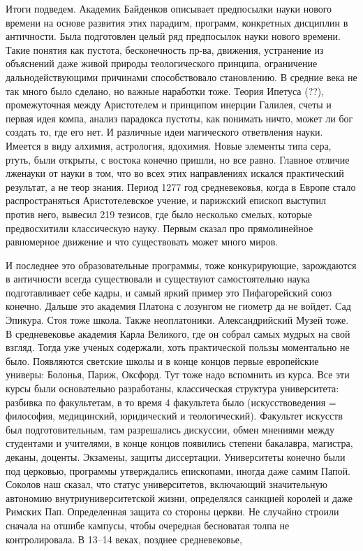 \documentclass[a4paper, 12pt]{article}
\begin{document}
Итоги подведем. Академик Байденков описывает предпосылки науки нового 
времени на основе развития этих парадигм, программ, конкретных дисциплин 
в античности. Была подготовлен целый ряд предпосылок науки нового 
времени. Такие понятия как пустота, бесконечность пр-ва, движения, 
устранение из объяснений даже живой природы теологического принципа, 
ограничение дальнодействующими причинами способствовало становлению. 
В средние века не так много было сделано, но важные наработки тоже. 
Теория Ипетуса (??), промежуточная между Аристотелем и принципом инерции 
Галилея, счеты и первая идея компа, анализ парадокса пустоты, как 
понимать ничто, может ли бог создать то, где его нет. И различные идеи 
магического ответвления науки. Имеется в виду алхимия, астрология, 
ядохимия. Новые элементы типа сера, ртуть, были открыты, с востока 
конечно пришли, но все равно. Главное отличие лженауки от науки в том, 
что во всех этих направлениях искался практический результат, а не теор 
знания. Период 1277 год средневековья, когда в Европе стало 
распространяться Аристотелевское учение, и парижский епископ выступил 
против него, вывесил 219 тезисов, где было несколько смелых, которые 
предвосхитили классическую науку. Первым сказал про прямолинейное 
равномерное движение и что существовать может много миров.

И последнее это образовательные программы, тоже конкурирующие, 
зарождаются в античности всегда существовали и существуют самостоятельно 
наука подготавливает себе кадры, и самый яркий пример это Пифагорейский 
союз конечно. Дальше это академия Платона с лозунгом не гиометр да не 
войдет. Сад Эпикура. Стоя тоже школа. Также неоплатоники. 
Александрийский Музей тоже. В средневековье академия Карла Великого, где 
он собрал самых мудрых на свой взгляд. Тогда уже ученых содержали, хоть 
практической пользы моментально не было. Появляются светские школы 
и в конце концов первые европейские универы: Болонья, Париж, Оксфорд. 
Тут тоже надо вспомнить из курса. Все эти курсы были основательно 
разработаны, классическая структура университета: разбивка по 
факультетам, в то время 4 факультета было (искусствоведения = философия, 
медицинский, юридический и теологический). Факультет искусств был 
подготовительным, там разрешались дискуссии, обмен мнениями между 
студентами и учителями, в конце концов появились степени бакалавра, 
магистра, деканы, доценты. Экзамены, защиты диссертации. Университеты 
конечно были под церковью, программы утверждались епископами, иногда 
даже самим Папой. Соколов наш сказал, что статус университетов, 
включающий значительную автономию внутриуниверситетской жизни, 
определялся санкцией королей и даже Римских Пап. Определенная защита со 
стороны церкви. Не случайно строили сначала на отшибе кампусы, чтобы 
очередная бесноватая толпа не контролировала. В 13--14 веках, позднее 
средневековье,
\end{document}
